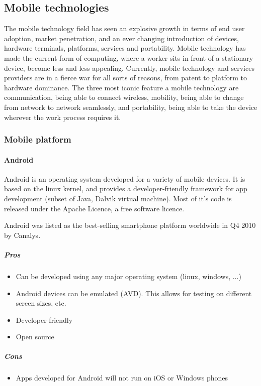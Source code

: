 \subsection{Mobile technologies}
The mobile technology field has seen an explosive growth in terms of end user adoption, market penetration, and an ever changing introduction of devices, hardware terminals, platforms, services and portability. Mobile technology has made the current form of computing, where a worker sits in front of a stationary device, become less and less appealing. Currently, mobile technology and services providers are in a fierce war for all sorts of reasons, from patent to platform to hardware dominance. The three most iconic feature a mobile technology are communication, being able to connect wireless, mobility, being able to change from network to network seamlessly, and portability, being able to take the device wherever the work process requires it.
\subsubsection{Mobile platform}

\paragraph{\bf{Android}}

	Android is an operating system developed for a variety of mobile devices.
	It is based on the linux kernel, and provides a developer-friendly
	framework for app development (subset of Java, Dalvik virtual machine).
	Most of it's code is released under the Apache Licence, a free software
	licence.

	Android was listed as the best-selling smartphone platform worldwide in Q4
	2010 by Canalys. \cite{wiki:android}

	\subparagraph{Pros}
		\begin{itemize}
			\item Can be developed using any major operating system (linux, windows, ...)
			\item Android devices can be emulated (AVD). This allows for testing on
			different screen sizes, etc.
			\item Developer-friendly
			\item Open source
		\end{itemize}

	\subparagraph{Cons}
		\begin{itemize}
			\item Apps developed for Android will not run on iOS or Windows phones
		\end{itemize}

